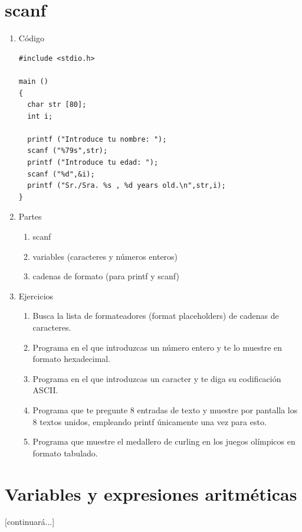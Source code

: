 \documentclass[a4paper,oneside]{article}
\begin{document}
\section{scanf}
  \begin{enumerate}
  \item Código

    \begin{verbatim}
#include <stdio.h>

main ()
{
  char str [80];
  int i;

  printf ("Introduce tu nombre: ");
  scanf ("%79s",str);  
  printf ("Introduce tu edad: ");
  scanf ("%d",&i);
  printf ("Sr./Sra. %s , %d years old.\n",str,i);
}
    \end{verbatim}
  \item Partes
    \begin{enumerate}
    \item scanf
    \item variables (caracteres y números enteros)
    \item cadenas de formato (para printf y scanf)
    \end{enumerate}

  \item Ejercicios
    \begin{enumerate}
    \item Busca la lista de formateadores (format placeholders) de cadenas de caracteres.
    \item Programa en el que introduzcas un número entero y te lo muestre en formato hexadecimal.
    \item Programa en el que introduzcas un caracter y te diga su codificación ASCII.
    \item Programa que te pregunte 8 entradas de texto y muestre por pantalla los 8 textos unidos, empleando printf únicamente una vez para esto.
    \item Programa que muestre el medallero de curling en los juegos olímpicos en formato tabulado.
    \end{enumerate}
  \end{enumerate}

\section{Variables y expresiones aritméticas}
[continuará...]
\end{document}
